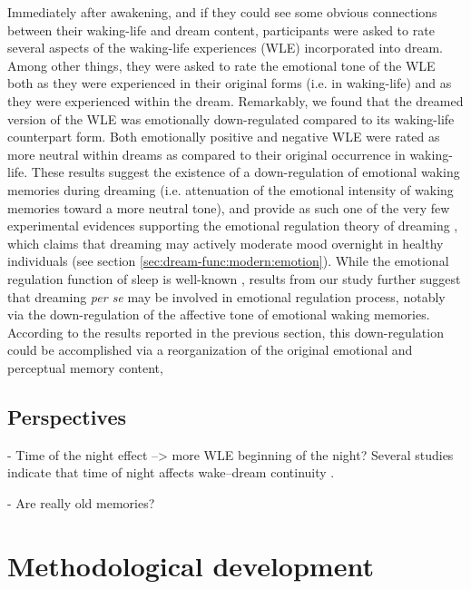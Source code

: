 Immediately after awakening, and if they could see some obvious connections between their waking-life and dream content, participants were asked to rate several aspects of the waking-life experiences (WLE) incorporated into dream. Among other things, they were asked to rate the emotional tone of the WLE both as they were experienced in their original forms (i.e. in waking-life) and as they were experienced within the dream. Remarkably, we found that the dreamed version of the WLE was emotionally down-regulated compared to its waking-life counterpart form. Both emotionally positive and negative WLE were rated as more neutral within dreams as compared to their original occurrence in waking-life. These results suggest the existence of a down-regulation of emotional waking memories during dreaming (i.e. attenuation of the emotional intensity of waking memories toward a more neutral tone), and provide as such one of the very few experimental evidences supporting the emotional regulation theory of dreaming \citep{cartwright_role_1998, cartwright_role_1998-1, perogamvros_roles_2012}, which claims that dreaming may actively moderate mood overnight in healthy individuals (see section \ref{sec:dream-func:modern:emotion}). While the emotional regulation function of sleep is well-known \citep{goldstein_role_2014}, results from our study further suggest that dreaming \emph{per se} may be involved in emotional regulation process, notably via the down-regulation of the affective tone of emotional waking memories. According to the results reported in the previous section, this down-regulation could be accomplished via a reorganization of the original emotional and perceptual memory content,

\section{Perspectives}
\label{disc:drf:summary:perspectives}

- Time of the night effect --> more WLE beginning of the night?
Several studies indicate that time of night affects wake–dream continuity \citep{roffwarg_effects_1978, malinowski_effect_2014}.

- Are really old memories?



\cleardoublepage
\chapter{Methodological development}
\label{disc:methods}

